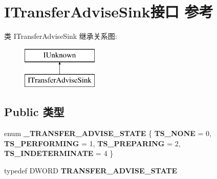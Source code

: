 \hypertarget{interface_i_transfer_advise_sink}{}\section{I\+Transfer\+Advise\+Sink接口 参考}
\label{interface_i_transfer_advise_sink}
类 I\+Transfer\+Advise\+Sink 继承关系图\+:\begin{figure}[H]
\begin{center}
\leavevmode
\includegraphics[height=2.000000cm]{interface_i_transfer_advise_sink}
\end{center}
\end{figure}
\subsection*{Public 类型}
\begin{DoxyCompactItemize}
\item 
\mbox{\label{interface_i_transfer_advise_sink_a896add4225b8ac4fbd6d8d0081a88e4f}} 
enum {\bfseries \+\_\+\+T\+R\+A\+N\+S\+F\+E\+R\+\_\+\+A\+D\+V\+I\+S\+E\+\_\+\+S\+T\+A\+TE} \{ {\bfseries T\+S\+\_\+\+N\+O\+NE} = 0, 
{\bfseries T\+S\+\_\+\+P\+E\+R\+F\+O\+R\+M\+I\+NG} = 1, 
{\bfseries T\+S\+\_\+\+P\+R\+E\+P\+A\+R\+I\+NG} = 2, 
{\bfseries T\+S\+\_\+\+I\+N\+D\+E\+T\+E\+R\+M\+I\+N\+A\+TE} = 4
 \}
\item 
\mbox{\label{interface_i_transfer_advise_sink_a8ad2776707199779dc2e51594fec4422}} 
typedef D\+W\+O\+RD {\bfseries T\+R\+A\+N\+S\+F\+E\+R\+\_\+\+A\+D\+V\+I\+S\+E\+\_\+\+S\+T\+A\+TE}
\end{DoxyCompactItemize}
